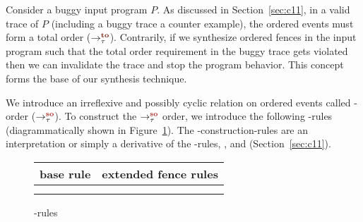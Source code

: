 Consider a buggy input program $P$.
%
As discussed in Section~\ref{sec:c11}, in a valid trace of $P$ 
(including a buggy trace \aka a counter example), 
the \sc ordered events must form a total order ($\setTO$).
%
Contrarily, if we synthesize \sc ordered fences in the input program 
such that the total order requirement in the buggy trace gets violated 
then we can invalidate the trace and stop the program behavior.
This concept forms the base of our synthesis technique.

We introduce an irreflexive and possibly cyclic relation
on \sc ordered events called \sc-order ($\setSO$).
%
To construct the $\setSO$ order, we introduce the following \lso-rules
(diagrammatically shown in Figure~\ref{fig:so rules}).
The \lso-construction-rules are an interpretation or simply a derivative 
of the \lto-rules, ,  and  
(Section~\ref{sec:c11}).

\begin{figure}[t]
	\begin{tabular}{|c||c|c|c|}
		\multicolumn{1}{c}{base rule} & 
		\multicolumn{3}{c}{extended fence rules} \\\hline
		
		\resizebox{0.24\textwidth}{!}{} &
		\resizebox{0.24\textwidth}{!}{} &
		\resizebox{0.24\textwidth}{!}{} &
		\resizebox{0.24\textwidth}{!}{} \\\hline
		
		\resizebox{0.24\textwidth}{!}{} &
		\resizebox{0.24\textwidth}{!}{} &
		\resizebox{0.24\textwidth}{!}{} &
		\resizebox{0.24\textwidth}{!}{} \\
		\hline
	\end{tabular}
	\caption{\lso-rules}
	\label{fig:so rules}
\end{figure}

